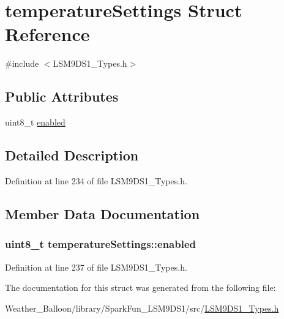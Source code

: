 \hypertarget{structtemperature_settings}{}\section{temperature\+Settings Struct Reference}
\label{structtemperature_settings}


{\ttfamily \#include $<$L\+S\+M9\+D\+S1\+\_\+\+Types.\+h$>$}

\subsection*{Public Attributes}
\begin{DoxyCompactItemize}
\item 
uint8\+\_\+t \hyperlink{structtemperature_settings_aeb258e2620d85e2f72fc057dbffa9715}{enabled}
\end{DoxyCompactItemize}


\subsection{Detailed Description}


Definition at line 234 of file L\+S\+M9\+D\+S1\+\_\+\+Types.\+h.



\subsection{Member Data Documentation}
\subsubsection[{\texorpdfstring{enabled}{enabled}}]{\setlength{\rightskip}{0pt plus 5cm}uint8\+\_\+t temperature\+Settings\+::enabled}\hypertarget{structtemperature_settings_aeb258e2620d85e2f72fc057dbffa9715}{}\label{structtemperature_settings_aeb258e2620d85e2f72fc057dbffa9715}


Definition at line 237 of file L\+S\+M9\+D\+S1\+\_\+\+Types.\+h.



The documentation for this struct was generated from the following file\+:\begin{DoxyCompactItemize}
\item 
Weather\+\_\+\+Balloon/library/\+Spark\+Fun\+\_\+\+L\+S\+M9\+D\+S1/src/\hyperlink{_l_s_m9_d_s1___types_8h}{L\+S\+M9\+D\+S1\+\_\+\+Types.\+h}\end{DoxyCompactItemize}
